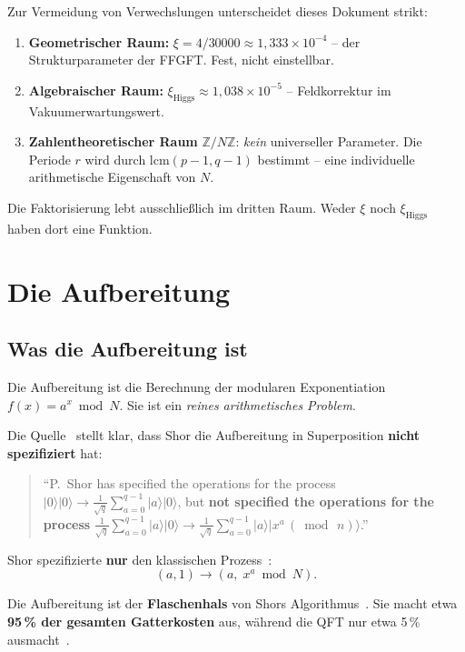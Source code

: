 \begin{keyresult}
Zur Vermeidung von Verwechslungen unterscheidet dieses Dokument strikt:
\begin{enumerate}
  \item \textbf{Geometrischer Raum:} $\xi = 4/30000 \approx 1{,}333\times10^{-4}$
    -- der Strukturparameter der FFGFT. Fest, nicht einstellbar.
  \item \textbf{Algebraischer Raum:} $\xi_{\text{Higgs}} \approx
    1{,}038\times10^{-5}$ -- Feldkorrektur im Vakuumerwartungswert.
  \item \textbf{Zahlentheoretischer Raum} $\mathbb{Z}/N\mathbb{Z}$:
    \emph{kein} universeller Parameter. Die Periode $r$ wird durch
    $\mathrm{lcm}(p-1,q-1)$ bestimmt -- eine individuelle arithmetische
    Eigenschaft von $N$.
\end{enumerate}
Die Faktorisierung lebt ausschließlich im dritten Raum. Weder $\xi$ noch
$\xi_{\text{Higgs}}$ haben dort eine Funktion.
\end{keyresult}

\section{Die Aufbereitung}
\label{sec:aufbereitung}

\subsection{Was die Aufbereitung ist}

Die Aufbereitung ist die Berechnung der modularen Exponentiation
$f(x) = a^x \bmod N$. Sie ist ein \emph{reines arithmetisches Problem}.

Die Quelle~\cite{IACR2014} stellt klar, dass Shor die Aufbereitung in
Superposition \textbf{nicht spezifiziert} hat:
\begin{quote}
``P.~Shor has specified the operations for the process
$|0\rangle|0\rangle \rightarrow \frac{1}{\sqrt{q}}\sum_{a=0}^{q-1}|a\rangle|0\rangle$,
but \textbf{not specified the operations for the process}
$\frac{1}{\sqrt{q}}\sum_{a=0}^{q-1}|a\rangle|0\rangle \rightarrow
\frac{1}{\sqrt{q}}\sum_{a=0}^{q-1}|a\rangle|x^a\,(\bmod\,n)\rangle$.''
\cite{IACR2014}
\end{quote}
Shor spezifizierte \textbf{nur} den klassischen Prozess~\cite{Shor1997}:
\[
  (a, 1) \rightarrow (a,\; x^a \bmod N).
\]

Die Aufbereitung ist der \textbf{Flaschenhals} von Shors
Algorithmus~\cite{BSI2023, Padho2026}. Sie macht etwa
\textbf{95\,\% der gesamten Gatterkosten} aus, während die QFT nur
etwa 5\,\% ausmacht~\cite{Padho2026}.

